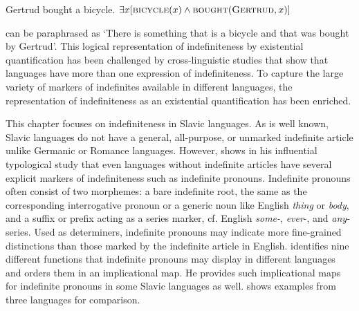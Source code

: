 \documentclass[output=paper,colorlinks,citecolor=brown]{langscibook}
\begin{document}
\ea\label{geist:ex:gertrud}\ea Gertrud bought a bicycle.\label{geist:ex:gertrud-a}
\ex $\exists x[\textsc{bicycle}(x)\wedge \textsc{bought}(\textsc{Gertrud}, x)]$\label{geist:ex:gertrud-b}
\z\z

\noindent{} can be paraphrased as `There is something that is a bicycle and that was bought by Gertrud'. This logical representation of indefiniteness by existential quantification has been challenged by cross-linguistic studies that show that languages have more than one expression of indefiniteness. To capture the large variety of markers of indefinites available in different languages, the representation of indefiniteness as an existential quantification has been enriched. 

This chapter focuses on indefiniteness in Slavic languages. As is well known, Slavic languages do not have a general, all-purpose, or unmarked indefinite article unlike Germanic or Romance languages. However, \citet{Haspelmath1997} shows in his influential typological study that even languages without indefinite articles have several explicit markers of indefiniteness such as indefinite pronouns. Indefinite pronouns often consist of two morphemes: a bare indefinite root, the same as the corresponding interrogative pronoun or a generic noun like English \textit{thing} or \textit{body}, and a suffix or prefix acting as a series marker, cf. English \mbox{\textit{some-},} \textit{ever}-, and \textit{any}-series. Used as determiners, indefinite pronouns may indicate more fine-grained distinctions than those marked by the indefinite article in English. \citet{Haspelmath1997} identifies nine different functions that indefinite pronouns may display in different languages and orders them in an implicational map. He provides such implicational maps for indefinite pronouns in some Slavic languages as well.  shows examples from three languages for comparison.
\end{document}

